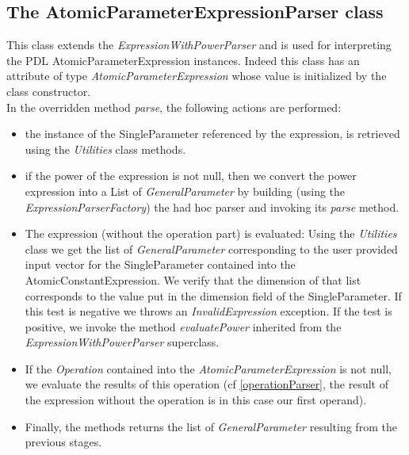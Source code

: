 \documentclass[a4paper,11pt] {ivoa}
\begin{document}
\subsection{The AtomicParameterExpressionParser class}
This class extends the {\it ExpressionWithPowerParser} and is used for interpreting the PDL {AtomicParameterExpression} instances. Indeed this class has an attribute of type {\it AtomicParameterExpression} whose value is initialized by the class constructor.\\
In the overridden method {\it parse}, the following actions are performed:
\begin{itemize}
\item the instance of the SingleParameter referenced by the expression, is retrieved using the {\it Utilities} class methods.
\item if the power of the expression is not null, then we convert the power expression into a List of {\it GeneralParameter} by building (using the {\it ExpressionParserFactory}) the had hoc parser and invoking its {\it parse} method.
\item The expression (without the operation part) is evaluated: Using the {\it Utilities} class we get the list of {\it GeneralParameter} corresponding to the user provided input vector for the SingleParameter contained into the AtomicConstantExpression. We verify that the dimension of that list corresponds to the value put in the dimension field of the SingleParameter. If this test is negative we throws an {\it InvalidExpression} exception. If the test is positive, we invoke the method {\it evaluatePower} inherited from the {\it ExpressionWithPowerParser} superclass. 
\item If the {\it Operation} contained into the {\it AtomicParameterExpression} is not null, we evaluate the results of this operation (cf \ref{operationParser}, the result of the expression without the operation is in this case our first operand).
\item Finally, the methods returns the list of {\it GeneralParameter} resulting from the previous stages.  
\end{itemize}
\end{document}
